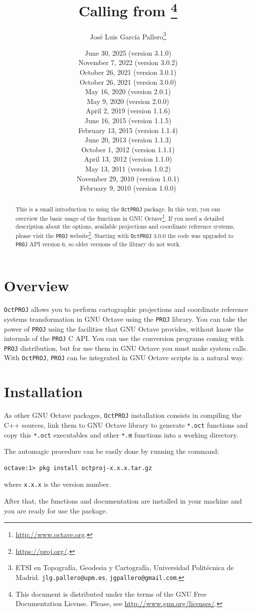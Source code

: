 \documentclass[10pt,a4paper]{article}
\title{\octproj\\Calling \proj{} from \octave\footnote{This document is
       distributed under the terms of the GNU Free Documentation License.
       Please, see \url{http://www.gnu.org/licenses/}.}}
\author{Jos\'e Luis Garc\'ia Pallero\footnote{ETSI en Topograf\'ia, Geodesia y
        Cartograf\'ia, Universidad Polit\'ecnica de Madrid.
        \texttt{jlg.pallero@upm.es}, \texttt{jgpallero@gmail.com}.}}
\date{June 30, 2025 (version 3.1.0)\\
      November 7, 2022 (version 3.0.2)\\
      October 26, 2021 (version 3.0.1)\\
      October 26, 2021 (version 3.0.0)\\
      May 16, 2020 (version 2.0.1)\\
      May 9, 2020 (version 2.0.0)\\
      April 2, 2019 (version 1.1.6)\\
      June 16, 2015 (version 1.1.5)\\
      February 13, 2015 (version 1.1.4)\\
      June 20, 2013 (version 1.1.3)\\
      October 1, 2012 (version 1.1.1)\\
      April 13, 2012 (version 1.1.0)\\
      May 13, 2011 (version 1.0.2)\\
      November 29, 2010 (version 1.0.1)\\
      February 9, 2010 (version 1.0.0)}
\newcommand{\octproj}{\texttt{OctPROJ}}
\newcommand{\proj}{\texttt{PROJ}}
\newcommand{\octave}{GNU Octave}
\begin{document}
\maketitle

\begin{abstract}
This is a small introduction to using the \octproj{} package. In this text, you
can overview the basic usage of the functions in
\octave\footnote{\url{http://www.octave.org}.}. If you need a detailed
description about the options, available projections and coordinate reference
systems, please visit the \proj{} website\footnote{\url{https://proj.org/}.}.
Starting with \octproj{} 3.0.0 the code was upgraded to \proj{} API version 6,
so older versions of the library do not work.
\end{abstract}

\tableofcontents

\section{Overview}

\octproj{} allows you to perform cartographic projections and coordinate
reference systems transformation in \octave{} using the \proj{} library. You can
take the power of \proj{} using the facilities that \octave{} provides, without
know the internals of the \proj{} C API. You can use the conversion programs
coming with \proj{} distribution, but for use them in \octave{} you must make
system calls. With \octproj{}, \proj{} can be integrated in \octave{} scripts in
a natural way.

\section{Installation}

As other \octave{} packages, \octproj{} installation consists in compiling the
C++ sources, link them to \octave{} library to generate \texttt{*.oct} functions
and copy this \texttt{*.oct} executables and other \texttt{*.m} functions into a
working directory.

The automagic procedure can be easily done by running the command:

\begin{verbatim}
octave:1> pkg install octproj-x.x.x.tar.gz
\end{verbatim}
where \texttt{x.x.x} is the version number.

After that, the functions and documentation are installed in your machine and
you are ready for use the package.
\end{document}
